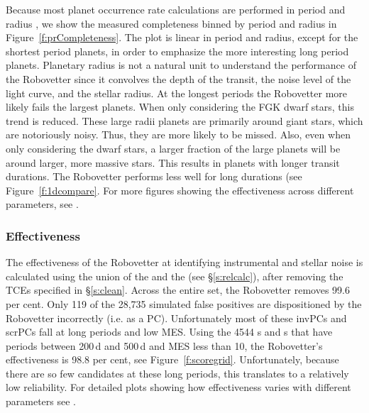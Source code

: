 Because most planet occurrence rate calculations are performed in period and radius \citep[e.g.][]{Burke2015}, we show the measured completeness binned by period and radius in Figure~\ref{f:prCompleteness}. The plot is linear in period and radius, except for the shortest period planets, in order to emphasize the more interesting long period planets. Planetary radius is not a natural unit to understand the performance of the Robovetter since it convolves the depth of the transit, the noise level of the light curve, and the stellar radius.  At the longest periods the Robovetter more likely fails the largest planets.  When only considering the FGK dwarf stars, this trend is reduced.  These large radii planets are primarily around giant stars, which are notoriously noisy. Thus, they are more likely to be missed. Also, even when only considering the dwarf stars, a larger fraction of the large planets will be around larger, more massive stars. This results in planets with longer transit durations. The Robovetter performs less well for long durations (see Figure~\ref{f:1dcompare}. For more figures showing the effectiveness across different parameters, see \citet{Coughlin2017a}.


\subsubsection{Effectiveness}
The effectiveness of the Robovetter at identifying instrumental and stellar noise is calculated using the union of the  and the  (see \S\ref{s:relcalc}), after removing the TCEs specified in \S\ref{s:clean}. Across the entire set, the Robovetter removes 99.6 per cent.  Only 119 of the 28,735 simulated false positives are dispositioned by the Robovetter incorrectly (i.e. as a PC).  Unfortunately most of these invPCs and scrPCs fall at long periods and low MES.
Using the 4544 \invtce s and \scrtce s that have periods between 200\,d and 500\,d and MES less than 10, the Robovetter's effectiveness is 98.8 per cent, see Figure~\ref{f:scoregrid}.  Unfortunately, because there are so few candidates at these long periods, this translates to a relatively low reliability.  For detailed plots showing how effectiveness varies with different parameters see \citet{Coughlin2017a}.


